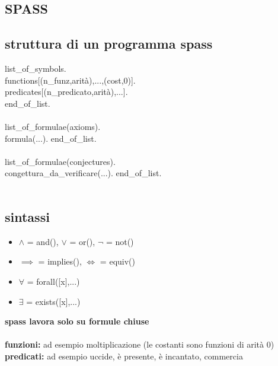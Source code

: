 \documentclass{article}
\newcommand\tab[1][0,5cm]{\hspace*{#1}}
\begin{document}
	
		\begin{multicols*}{3}
			
			
		\section{SPASS}
		\subsection{struttura di un programma spass}
		list\_of\_symbols.\\
		\tab functions[(n\_funz,arità),...,(cost,0)].\\
		\tab predicates[(n\_predicato,arità),...].\\
		end\_of\_list.\\\\
		list\_of\_formulae(axioms).\\
		\tab formula(...).
		end\_of\_list.\\\\
		list\_of\_formulae(conjectures).\\
		\tab congettura\_da\_verificare(...).
		end\_of\_list.\\\\
		\subsection{sintassi}
		\begin{itemize}
			\setlength\itemsep{0.1mm}
			\item \(\land\) = and(), \(\lor\) = or(), \(\neg\) = not()
			\item \(\implies\) = implies(), \(\iff\) = equiv()
			\item \(\forall\) = forall([x],...)
			\item \(\exists\) = exists([x],...)
		\end{itemize}
		\textbf{spass lavora solo su formule chiuse}\\\\
		\textbf{funzioni:}
		ad esempio moltiplicazione (le costanti sono funzioni di arità 0)\\
		\textbf{predicati:}
		ad esempio uccide, è presente, è incantato, commercia\\
		
		
		\end{multicols*}
\end{document}

